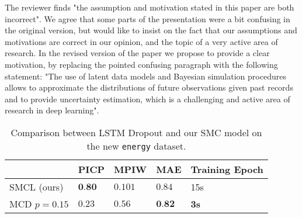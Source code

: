 \documentclass{article}
\begin{document}
The reviewer finds "the assumption and motivation stated in this paper are both incorrect".
We agree that some parts of the presentation were a bit confusing in the original version, but would like to insist on the fact that our assumptions and motivations are correct in our opinion, and the topic of a very active area of research.
In the revised version of the paper we propose to provide a clear motivation, by replacing the pointed confusing paragraph with the following statement: "The use of latent data models and Bayesian simulation procedures allows to approximate the distributions of future observations given past records and to provide uncertainty estimation, which is a challenging and active area of research in deep learning".

\begin{table}[htpb]
	\centering
	\caption{Comparison between LSTM Dropout and our SMC model on the new \texttt{energy} dataset.}
	\label{tab:comparison}
	\begin{tabular}{lllll}
		\toprule
		             & PICP            & MPIW    & MAE             & Training Epoch \\
		\toprule
		SMCL (ours)  & $\textbf{0.80}$ & $0.101$ & $0.84$          & 15s            \\
		MCD $p=0.15$ & $0.23$          & $0.56$  & $\textbf{0.82}$ & \textbf{3s}    \\
		\bottomrule
	\end{tabular}
\end{table}



\end{document}
